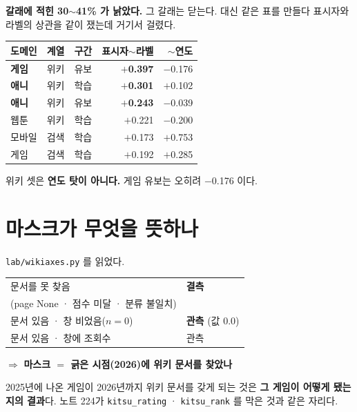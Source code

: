 \documentclass[10pt]{article}
\begin{document}
\textbf{갈래에 적힌 30$\sim$41\% 가 낡았다.} 그 갈래는 닫는다. 대신 같은
표를 만들다 표시자와 라벨의 상관을 같이 쟀는데 거기서 걸렸다.

\begin{center}\footnotesize
\begin{tabular}{lllrr}
\hline
도메인 & 계열 & 구간 & 표시자$\sim$라벨 & $\sim$연도 \\
\hline
\textbf{게임} & 위키 & 유보 & \textbf{$+$0.397} & $-$0.176 \\
\textbf{애니} & 위키 & 학습 & \textbf{$+$0.301} & $+$0.102 \\
\textbf{애니} & 위키 & 유보 & \textbf{$+$0.243} & $-$0.039 \\
웹툰 & 위키 & 학습 & $+$0.221 & $-$0.200 \\
모바일 & 검색 & 학습 & $+$0.173 & $+$0.753 \\
게임 & 검색 & 학습 & $+$0.192 & $+$0.285 \\
\hline
\end{tabular}
\end{center}

위키 셋은 \textbf{연도 탓이 아니다.} 게임 유보는 오히려 $-$0.176 이다.

\section{마스크가 무엇을 뜻하나}

\texttt{lab/wikiaxes.py} 를 읽었다.

\begin{center}\footnotesize
\begin{tabular}{ll}
\hline
문서를 못 찾음 & \textbf{결측} \\
(page None · 점수 미달 · 분류 불일치) & \\
문서 있음 · 창 비었음($n{=}0$) & \textbf{관측} (값 0.0) \\
문서 있음 · 창에 조회수 & 관측 \\
\hline
\end{tabular}
\end{center}

\begin{center}\small
$\Rightarrow$ \textbf{마스크 ${=}$ 긁은 시점(2026)에 위키 문서를 찾았나}
\end{center}

2025년에 나온 게임이 2026년까지 위키 문서를 갖게 되는 것은 \textbf{그 게임이
어떻게 됐는지의 결과}다. 노트 224가 \texttt{kitsu\_rating} ·
\texttt{kitsu\_rank} 를 막은 것과 같은 자리다.
\end{document}
